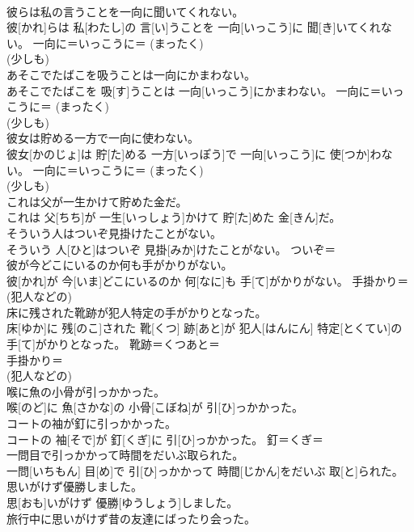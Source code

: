 \documentclass[8pt]{extreport}
\begin{document}
\begin{CJK}{UTF8}{min}
{\\	彼らは私の言うことを一向に聞いてくれない。	
\\	彼[かれ]らは 私[わたし]の 言[い]うことを 一向[いっこう]に 聞[き]いてくれない。	一向に＝いっこうに＝ (まったく) 
\\	(少しも) 
\\	あそこでたばこを吸うことは一向にかまわない。	
\\	あそこでたばこを 吸[す]うことは 一向[いっこう]にかまわない。	一向に＝いっこうに＝ (まったく) 
\\	(少しも) 
\\	彼女は貯める一方で一向に使わない。	
\\	彼女[かのじょ]は 貯[た]める 一方[いっぽう]で 一向[いっこう]に 使[つか]わない。	一向に＝いっこうに＝ (まったく) 
\\	(少しも) 
\\	これは父が一生かけて貯めた金だ。	
\\	これは 父[ちち]が 一生[いっしょう]かけて 貯[た]めた 金[きん]だ。	
\\	そういう人はついぞ見掛けたことがない。	
\\	そういう 人[ひと]はついぞ 見掛[みか]けたことがない。	ついぞ＝ 
\\	彼が今どこにいるのか何も手がかりがない。	
\\	彼[かれ]が 今[いま]どこにいるのか 何[なに]も 手[て]がかりがない。	手掛かり＝ 
\\	(犯人などの) 
\\	床に残された靴跡が犯人特定の手がかりとなった。	
\\	床[ゆか]に 残[のこ]された 靴[くつ] 跡[あと]が 犯人[はんにん] 特定[とくてい]の 手[て]がかりとなった。	靴跡＝くつあと＝ 
\\	手掛かり＝ 
\\	(犯人などの) 
\\	喉に魚の小骨が引っかかった。	
\\	喉[のど]に 魚[さかな]の 小骨[こぼね]が 引[ひ]っかかった。	
\\	コートの袖が釘に引っかかった。	
\\	コートの 袖[そで]が 釘[くぎ]に 引[ひ]っかかった。	釘＝くぎ＝ 
\\	一問目で引っかかって時間をだいぶ取られた。	
\\	一問[いちもん] 目[め]で 引[ひ]っかかって 時間[じかん]をだいぶ 取[と]られた。	
\\	思いがけず優勝しました。	
\\	思[おも]いがけず 優勝[ゆうしょう]しました。	
\\	旅行中に思いがけず昔の友達にばったり会った。	
}
\end{CJK}
\end{document}
